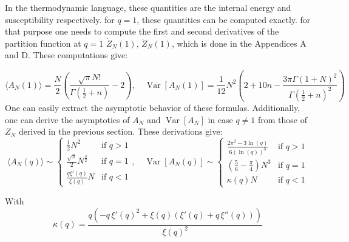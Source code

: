 \documentclass[pdflatex,sn-mathphys-num]{sn-jnl}
\theoremstyle{definition}
\theoremstyle{remark}
\numberwithin{equation}{section}
\begin{document}
In the thermodynamic language, these quantities are the internal energy and susceptibility respectively.
for $q=1$, these quantities can be computed exactly. for that purpose one needs to compute the first and second derivatives of the partition function at $q=1$ $\dot{Z}_N(1)$, $\ddot{Z}_N(1)$, which is done in the Appendices A and D. These computations give:

\begin{equation}
\langle A_N(1) \rangle =
    \frac{N}{2} \left(\frac{\sqrt{\pi} N! }{\Gamma\left(\frac{1}{2} + n\right)} - 2\right), 
    \quad
    \operatorname{Var}[A_N(1)] = 
    \frac{1}{12} N^2 \left(2 + 10n - \frac{3 \pi \Gamma(1 + N)^2}{\Gamma\left(\frac{1}{2} + n\right)^2}\right)
    \label{exp_var_q_one}
\end{equation}
One can easily extract the asymptotic behavior of these formulas. Additionally, one can derive the asymptotics of $A_N$ and $\operatorname{Var}[A_N]$ in case $q\neq 1$ from those of $Z_N$ derived in the previous section. These derivations give:
\begin{equation}
\langle A_N(q) \rangle
    \sim 
        \begin{cases}
      \frac{1}{2} N^2 & \text{if } q > 1\\
       \frac{\sqrt{\pi}}{2}N^{\frac{3}{2}}  & \text{if } q = 1\\
        \frac{q\xi'(q)}{\xi(q)} N & \text{if } q < 1
    \end{cases},
    \quad
    \operatorname{Var}[A_N(q)]
    \sim 
        \begin{cases}
      \frac{2 \pi^2 - 3\ln(q)}{6(\ln(q))^3} & \text{if } q > 1\\
       (\frac{5}{6} - \frac{\pi}{4})N^3   & \text{if } q = 1 \\
       \kappa(q) N & \text{if } q < 1
    \end{cases}
\end{equation}

With
\begin{equation}
  \kappa(q) = 
\frac{q \left( -q \, \xi'(q)^2 + \xi(q) \left( \xi'(q) + q \, \xi''(q) \right) \right)}{\xi(q)^2} 
\end{equation}
\end{document}
